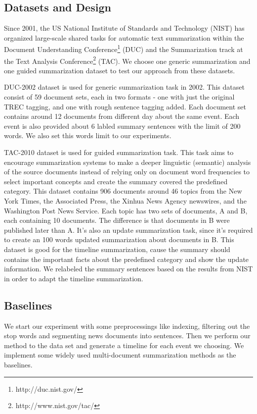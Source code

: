 \documentclass[print]{jicspack}
\begin{document}
\subsection{Datasets and Design}

Since 2001, the US National Institute of Standards and Technology (NIST) has organized large-scale shared tasks for automatic text summarization within the Document Understanding Conference\footnote{http://duc.nist.gov/} (DUC) and the Summarization track at the Text Analysis Conference\footnote{http://www.nist.gov/tac/} (TAC).
We choose one generic summarization and one guided summarization dataset to test our approach from these datasets.

DUC-2002 dataset is used for generic summarization task in 2002.
This dataset consist of 59 document sets, each in two formats - one with just the original TREC tagging, and one with rough sentence tagging added.
Each document set contains around 12 documents from different day about the same event.
Each event is also provided about 6 labled summary sentences with the limit of 200 words.
We also set this words limit to our experiments.

TAC-2010 dataset is used for guided summarization task.
This task aims to encourage summarization systems to make a deeper linguistic (semantic) analysis of the source documents instead of relying only on document word frequencies to select important concepts and create the summary covered the predefined category.
This dataset contains 906 documents around 46 topics from the New York Times, the Associated Press, the Xinhua News Agency newswires, and the Washington Post News Service.
Each topic has two sets of documents, A and B, each containing 10 documents.
The difference is that documents in B were published later than A.
It's also an update summarization task, since it's required to create an 100 words updated summarization about documents in B.
This dataset is good for the timeline summarization, cause the summary should contains the important facts about the predefined category and show the update information.
We relabeled the summary sentences based on the results from NIST in order to adapt the timeline  summarization.


\subsection{Baselines}
We start our experiment with some preprocessings like indexing, filtering out the stop words and segmenting news documents into sentences. Then we perform our method to the data set and generate a timeline for each event we choosing. We implement some widely used multi-document summarization methods as the baselines.
\end{document}
